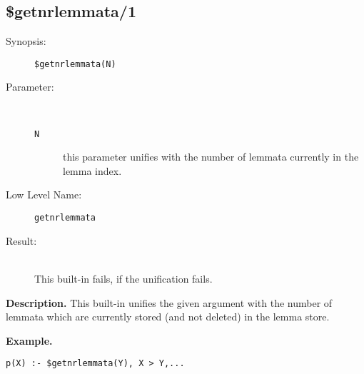 %
%
%
\subsection{\$getnrlemmata/1}

\begin{description}
\item[Synopsis:]
	{\tt \$getnrlemmata(N)}
\item[Parameter:]\ \\[-0.5cm]
	\begin{description}
	\item[{\tt N}]
this parameter unifies with the number of lemmata currently in the
lemma index.

	\end{description}
\item[Low Level Name:]
	{\tt getnrlemmata}
\item[Result:]\ \\
This built-in fails, if the unification fails.

\end{description}

\vspace*{0.5cm}
\noindent
{\bf Description.}
This built-in unifies the given argument with the number
of lemmata which are currently stored (and not deleted) in the
lemma store.
 
\vspace*{0.5cm}
\noindent
{\bf Example.}
\begin{verbatim}
p(X) :- $getnrlemmata(Y), X > Y,...
\end{verbatim}


